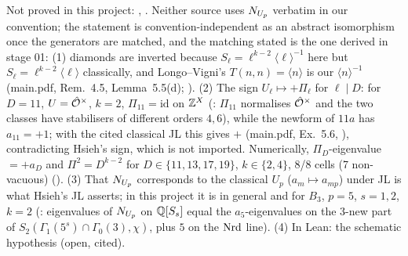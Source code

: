 \begin{outline}
Not proved in this project: \stcited{} \cite[Prop.~6.1]{LV}, \cite[\S4.5]{Hs}. Neither source uses $N_{U_p}$ verbatim in our convention; the
statement is convention-independent as an abstract isomorphism once the generators are matched, and the matching stated is the one
derived in stage 01: (1) diamonds are inverted because $S_\ell=\ell^{k-2}\langle\ell\rangle^{-1}$ here but $S_\ell=\ell^{k-2}\langle\ell\rangle$ classically,
and Longo--Vigni's $T(n,n)=\langle n\rangle$ is our $\langle n\rangle^{-1}$ (main.pdf, Rem.~4.5, Lemma~5.5(d); \stpmc). (2) The sign
$U_\ell\mapsto+\Pi_\ell$ for $\ell\mid D$: for $D=11$, $U=\hat{\mathcal{O}}^\times$, $k=2$, $\Pi_{11}=\mathrm{id}$ on $\mathbb{Z}^X$ (\stproved: $\Pi_{11}$ normalises $\hat{\mathcal{O}}^\times$
and the two classes have stabilisers of different orders $4,6$), while the newform of $11a$ has $a_{11}=+1$; with the cited classical JL this
gives $+$ (main.pdf, Ex.~5.6, \stpmc), contradicting Hsieh's sign, which is not imported. Numerically, $\Pi_D$-eigenvalue $=+a_D$ and
$\Pi^2=D^{k-2}$ for $D\in\{11,13,17,19\}$, $k\in\{2,4\}$, 8/8 cells (7 non-vacuous) \stcomp{} (). (3) That $N_{U_p}$
corresponds to the classical $U_p$ ($a_m\mapsto a_{mp}$) under JL is what Hsieh's JL asserts; in this project it is \stexp{} in general and
\stcomp{} for $B_3$, $p=5$, $s=1,2$, $k=2$ (: eigenvalues of $N_{U_p}$ on $\mathbb{Q}[S_s]$ equal the $a_5$-eigenvalues on the
$3$-new part of $S_2(\Gamma_1(5^s)\cap\Gamma_0(3),\chi)$, plus $5$ on the $\mathrm{Nrd}$ line). (4) In Lean: the schematic hypothesis
 (open, cited).
\end{outline}

